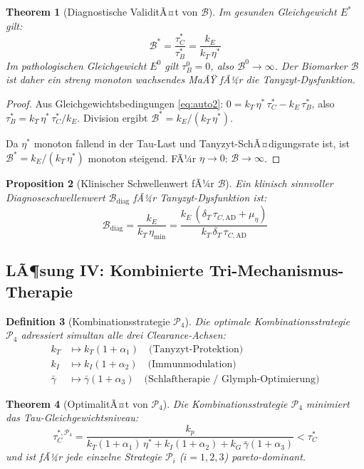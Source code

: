 ﻿\documentclass[12pt,a4paper]{article}
\newtheorem{theorem}{Theorem}[section]
\newtheorem{proposition}[theorem]{Proposition}
\newtheorem{definition}[theorem]{Definition}
\theoremstyle{definition}
\begin{document}
	\begin{theorem}[Diagnostische ValiditÃ¤t von $\mathcal{B}$]
		\label{thm:biomarker}
		Im gesunden Gleichgewicht $E^*$ gilt:
		\[
		\mathcal{B}^* = \frac{\tau_C^*}{\tau_B^*} = \frac{k_E}{k_T\,\eta^*}
		\]
		Im pathologischen Gleichgewicht $E^0$ gilt $\tau_B^0 = 0$, also $\mathcal{B}^0 \to \infty$. Der Biomarker $\mathcal{B}$ ist daher ein streng monoton wachsendes MaÃŸ fÃ¼r die Tanyzyt-Dysfunktion.
	\end{theorem}
	
	\begin{proof}
		Aus Gleichgewichtsbedingungen \eqref{eq:auto2}: $0 = k_T\,\eta^*\,\tau_C^* - k_E\,\tau_B^*$, also $\tau_B^* = k_T\,\eta^*\,\tau_C^* / k_E$. Division ergibt $\mathcal{B}^* = k_E / (k_T\,\eta^*)$.
		
		Da $\eta^*$ monoton fallend in der Tau-Last und Tanyzyt-SchÃ¤digungsrate ist, ist $\mathcal{B}^* = k_E/(k_T\,\eta^*)$ monoton steigend. FÃ¼r $\eta \to 0$: $\mathcal{B} \to \infty$.
	\end{proof}
	
	\begin{proposition}[Klinischer Schwellenwert fÃ¼r $\mathcal{B}$]
		Ein klinisch sinnvoller Diagnoseschwellenwert $\mathcal{B}_{\text{diag}}$ fÃ¼r Tanyzyt-Dysfunktion ist:
		\[
		\mathcal{B}_{\text{diag}} = \frac{k_E}{k_T\,\eta_{\min}} = \frac{k_E\,(\delta_T\,\tau_{C,\text{AD}} + \mu_\eta)}{k_T\,\delta_T\,\tau_{C,\text{AD}}}
		\]
	\end{proposition}
	
	\subsection{LÃ¶sung IV: Kombinierte Tri-Mechanismus-Therapie}
	
	\begin{definition}[Kombinationsstrategie $\mathcal{P}_4$]
		Die optimale Kombinationsstrategie $\mathcal{P}_4$ adressiert simultan alle drei Clearance-Achsen:
		\begin{align*}
			k_T &\mapsto k_T(1+\alpha_1)\quad \text{(Tanyzyt-Protektion)} \\
			k_I &\mapsto k_I(1+\alpha_2)\quad \text{(Immunmodulation)} \\
			\bar{\gamma} &\mapsto \bar{\gamma}(1+\alpha_3)\quad \text{(Schlaftherapie / Glymph-Optimierung)}
		\end{align*}
	\end{definition}
	
	\begin{theorem}[OptimalitÃ¤t von $\mathcal{P}_4$]
		\label{thm:optimality}
		Die Kombinationsstrategie $\mathcal{P}_4$ minimiert das Tau-Gleichgewichtsniveau:
		\[
		\tau_C^{*,\mathcal{P}_4} = \frac{k_p}{k_T(1+\alpha_1)\,\eta^* + k_I(1+\alpha_2) + k_G\,\bar{\gamma}(1+\alpha_3)} < \tau_C^*
		\]
		und ist fÃ¼r jede einzelne Strategie $\mathcal{P}_i$ ($i=1,2,3$) pareto-dominant.
	\end{theorem}
	
\end{document}
